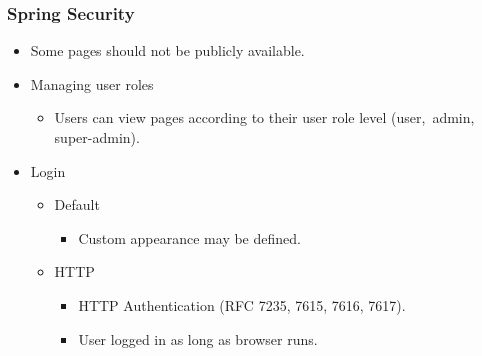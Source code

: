 \documentclass[10pt,xcolor=pdflatex, table]{beamer}
\begin{document}
\begin{frame}\frametitle{Spring Security}
	\begin{itemize}
		\item Some pages should not be publicly available.
		\item Managing user roles
          \begin{itemize}
        	\item Users can view pages according to their user role level (user,~admin, super-admin).
          \end{itemize}
		\item Login
          \begin{itemize}
        	\item Default
              \begin{itemize}
            	\item Custom appearance may be defined.
              \end{itemize}
            \item HTTP
              \begin{itemize}
                \item HTTP Authentication (RFC 7235, 7615, 7616, 7617).
            	\item User logged in as long as browser runs.
              \end{itemize}
          \end{itemize}
	\end{itemize}
\end{frame}
\end{document}
